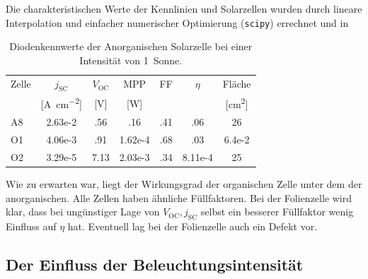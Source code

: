 \documentclass[slug=SZ, room=Hermann-Krone-Bau\,\ Labor\ 1.25, supervisor=Martin\ Kroll]{../../Lab_Report_LaTeX/lab_report}
\newcommand{\sun}[1]{\SI{#1}{Sonne}}
\newcommand{\voc}{V_{\text{OC}}}
\newcommand{\jsc}{j_{\text{SC}}}
\begin{document}
Die charakteristischen Werte der Kennlinien und Solarzellen wurden
durch lineare Interpolation und einfacher numerischer Optimierung
(\verb|scipy|) errechnet und in

\begin{table}[h]
  \centering
  \begin{tabular}{l|SSSSSS}
    \toprule
    Zelle & {\(\jsc\)} & {\(\voc\)} & {MPP}
    & {FF} & {\(\eta\)} & {Fl\"ache}\\
    {} & {[\si{A\per\centi\meter^2}]} & {[\si{\volt}]} & {[\si{\watt}]}
    & {} & {} & {[\si{\centi\meter^2}]}\\
    \midrule
    A8 & 2.63e-2 & .56 & .16 & .41 & .06 & 26 \\
    O1 & 4.06e-3 & .91 & 1.62e-4 & .68 & .03 & 6.4e-2\\
    O2 & 3.29e-5 & 7.13 & 2.03e-3 & .34 & 8.11e-4 & 25 \\
  \end{tabular}
  \caption{Diodenkennwerte der Anorganischen Solarzelle bei einer
    Intensit\"at von \sun{1}.}
  \label{tab:diodano}
\end{table}

Wie zu erwarten war, liegt der Wirkungsgrad der organischen Zelle
unter dem der anorganischen. Alle Zellen haben \"ahnliche
F\"ullfaktoren.
Bei der Folienzelle wird klar, dass bei ung\"unstiger Lage von
\(\voc, \jsc\) selbst ein besserer F\"ullfaktor wenig Einfluss auf
\(\eta\) hat. Eventuell lag bei der Folienzelle auch ein Defekt vor.


\subsection{Der Einfluss der Beleuchtungsintensität}
\label{sec:auswintens}
\end{document}
